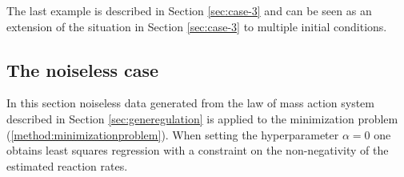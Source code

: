 \documentclass[oneside, abstracton, titlepage]{scrartcl}
\begin{document}
	The last example is described in Section \ref{sec:case-3} and can be seen as an extension of the situation in Section \ref{sec:case-3} to multiple initial conditions.
	

	\subsection{The noiseless case}\label{sec:case-1}
	
	In this section noiseless data generated from the law of mass action system described in Section \ref{sec:generegulation} is applied to the minimization problem (\ref{method:minimizationproblem}). When setting the hyperparameter $\alpha=0$ one obtains least squares regression with a constraint on the non-negativity of the estimated reaction rates.
	
\end{document}
